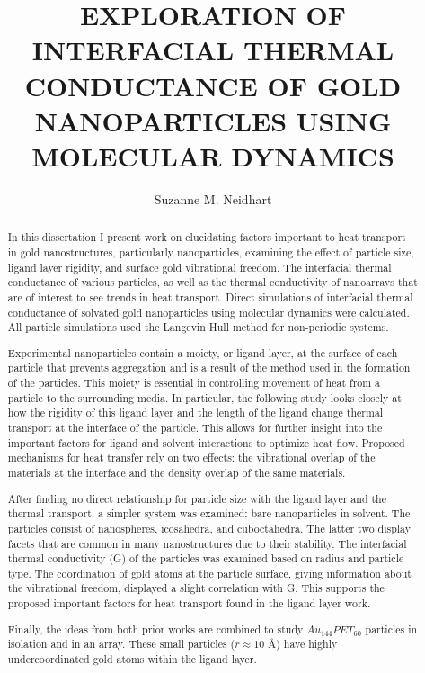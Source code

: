\documentclass[noinfo,final,sort&compress]{nddiss2e}
\begin{document}
\frontmatter %

\title{EXPLORATION OF INTERFACIAL THERMAL CONDUCTANCE OF GOLD NANOPARTICLES USING MOLECULAR DYNAMICS}
\author{Suzanne M. Neidhart}
\maketitle


\begin{abstract}
In this dissertation I present work on elucidating factors important to heat transport in gold nanostructures, particularly nanoparticles, examining the effect of particle size, ligand layer rigidity, and surface gold vibrational freedom. The interfacial thermal conductance of various particles, as well as the thermal conductivity of nanoarrays that are of interest to see trends in heat transport.
Direct simulations of interfacial thermal conductance of solvated gold nanoparticles using molecular dynamics were calculated. All particle simulations used the Langevin Hull method for non-periodic systems.

Experimental nanoparticles contain a moiety, or ligand layer, at the surface of each particle that prevents aggregation and is a result of the method used in the formation of the particles. This moiety is essential in controlling movement of heat from a particle to the surrounding media. In particular, the following study looks closely at how the rigidity of this ligand layer and the length of the ligand change thermal transport at the interface of the particle. This allows for further insight into the important factors for ligand and solvent interactions to optimize heat flow. Proposed mechanisms for heat transfer rely on two effects: the vibrational overlap of the materials at the interface and the density overlap of the same materials.

After finding no direct relationship for particle size with the ligand layer and the thermal transport, a simpler system was examined: bare nanoparticles in solvent.
The particles consist of nanospheres, icosahedra, and cuboctahedra. The latter two display facets that are common in many nanostructures due to their stability.
The interfacial thermal conductivity (G) of the particles was examined based on radius and particle type. The coordination of gold atoms at the particle surface, giving information about the vibrational freedom, displayed a slight correlation with G. This supports the proposed important factors for heat transport found in the ligand layer work.

Finally, the ideas from both prior works are combined to study $Au_{144}PET_{60}$ particles in isolation and in an array. These small particles ($r \approx 10$ \AA) have highly undercoordinated gold atoms within the ligand layer.
\end{abstract}
\end{document}
